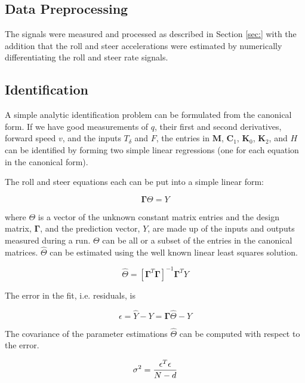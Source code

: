 \documentclass[a4paper]{article}
\begin{document}
\subsection{Data Preprocessing}

The signals were measured and processed as described in Section \ref{sec:} with
the addition that the roll and steer accelerations were estimated by
numerically differentiating the roll and steer rate signals.

\subsection{Identification}

A simple analytic identification problem can be formulated from the canonical
form. If we have good measurements of $q$, their first and second derivatives,
forward speed $v$, and the inputs $T_\delta$ and $F$, the entries in
$\mathbf{M}$, $\mathbf{C}_1$, $\mathbf{K}_0$, $\mathbf{K}_2$, and $H$ can be
identified by forming two simple linear regressions (one for each equation
in the canonical form).

The roll and steer equations each can be put into a simple linear form:

\begin{equation}
  \mathbf{\Gamma} \Theta = Y
\end{equation}

where $\Theta$ is a vector of the unknown constant matrix entries and the
design matrix, $\mathbf{\Gamma}$, and the prediction vector, $Y$, are made up
of the inputs and outputs measured during a run. $\Theta$ can be all or a
subset of the entries in the canonical matrices. $\hat{\Theta}$ can be
estimated using the well known linear least squares solution.

\begin{equation}
  \hat{\Theta} = [\mathbf{\Gamma}^T \mathbf{\Gamma}]^{-1} \mathbf{\Gamma}^T Y
  \label{eq:theta-estimate}
\end{equation}

The error in the fit, i.e. residuals, is

\begin{equation}
  \epsilon = \hat{Y} - Y = \mathbf{\Gamma} \hat{\Theta} - Y
  \label{eq:fit-error}
\end{equation}

The covariance of the parameter estimations $\hat{\Theta}$ can be computed with
respect to the error.

\begin{equation}
  \sigma^2 = \frac{\epsilon^T\epsilon}{N - d} \\
  \label{eq:fit-variance}
\end{equation}
\end{document}
